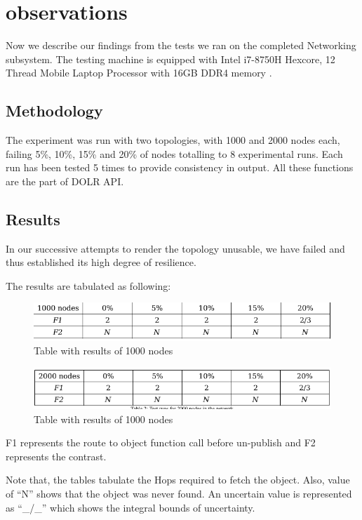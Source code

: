 \documentclass[conference,a4paper,12pt]{IEEEtran}
\begin{document}
\section{observations}
Now we describe our findings from the tests we ran on the completed Networking subsystem. The testing machine is equipped with Intel i7-8750H Hexcore, 12 Thread Mobile Laptop Processor with 16GB DDR4 memory .

	\subsection{Methodology}
	The experiment was run with two topologies, with 1000 and 2000 nodes each,
failing 5\%, 10\%, 15\% and 20\% of nodes totalling to 8 experimental runs. Each run
has been tested 5 times to provide consistency in output. All these functions are the
part of DOLR API.

	\subsection{Results}
	In our successive attempts to render the topology unusable, we have failed and thus
established its high degree of resilience.

The results are tabulated as following:

	\begin{figure}[h]
	  \includegraphics[width=\linewidth]{../observations/test_1000_nodes.png}
	  \caption{Table with results of 1000 nodes}
	  \label{Test 1}
	\end{figure}
	
	\begin{figure}[h]
	  \includegraphics[width=\linewidth]{../observations/test_2000_nodes.png}
	  \caption{Table with results of 1000 nodes}
	  \label{Test 2}
	\end{figure}

F1 represents the route to object function call before un-publish and F2 represents the contrast.

Note that, the tables tabulate the Hops required to fetch the object. Also,
value of “N” shows that the object was never found. An uncertain value is
represented as ``\_/\_'' which shows the integral bounds of uncertainty.
\end{document}
